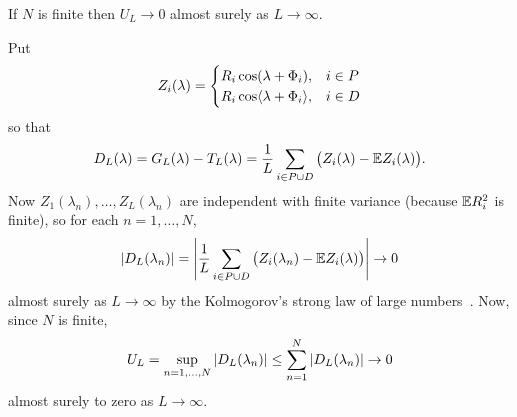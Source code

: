 \documentclass[journal]{IEEEtran}
\begin{document}
\begin{lemma}\label{lem:supDLlambdan}
If $N$ is finite then $U_L \rightarrow 0$ almost surely as $L \rightarrow \infty$.
\end{lemma}
\begin{IEEEproof}
Put
\[
Z_i(\lambda) = \begin{cases}
R_i\cos(\lambda + \Phi_i) , & i \in P \\
R_i\cos\langle \lambda + \Phi_i \rangle , & i \in D
\end{cases}
\]
so that
\[
D_L(\lambda) = G_L(\lambda) - T_L(\lambda) = \frac{1}{L}\sum_{i\in P \cup D} \big( Z_i(\lambda) - {\mathbb E} Z_i(\lambda) \big).
\]
Now $Z_1(\lambda_n), \dots,Z_L(\lambda_n)$ are independent with finite variance (because ${\mathbb E} R_i^2$ is finite), so for each $n =1, \dots, N$,
\[
{\left\vert D_L(\lambda_n) \right\vert} = {\left\vert \frac{1}{L}\sum_{i\in P \cup D} \big( Z_i(\lambda_n) - {\mathbb E} Z_i(\lambda)\big) \right\vert} \rightarrow 0
\]
almost surely as $L\rightarrow\infty$ by the Kolmogorov's strong law of large numbers~\cite[Theorem 2.3.10]{SenSinger_large_sample_stats_1993}.  Now, since $N$ is finite,
\[
U_L = \sup_{n=1,\dots,N}{\vert D_L(\lambda_n) \vert} \leq \sum_{n=1}^N {\vert D_L(\lambda_n) \vert} \rightarrow 0
\]
almost surely to zero as $L \rightarrow \infty$.
\end{IEEEproof}
\end{document}

